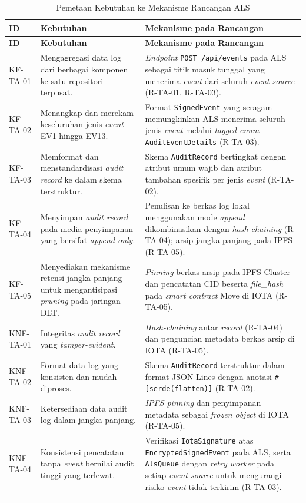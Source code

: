 \begin{xltabular}{\textwidth}{|p{1.8cm}|X|X|}
\caption{Pemetaan Kebutuhan ke Mekanisme Rancangan ALS}
\label{tab:pemenuhan-kebutuhan}\\
\hline
\textbf{ID} & \textbf{Kebutuhan} & \textbf{Mekanisme pada Rancangan} \\
\hline
\endfirsthead
\hline
\textbf{ID} & \textbf{Kebutuhan} & \textbf{Mekanisme pada Rancangan} \\
\hline
\endhead
\hline
\endfoot

KF-TA-01 & Mengagregasi data log dari berbagai komponen ke satu repositori terpusat. & \textit{Endpoint} \texttt{POST /api/events} pada ALS sebagai titik masuk tunggal yang menerima \textit{event} dari seluruh \textit{event source} (R-TA-01, R-TA-03). \\
\hline
KF-TA-02 & Menangkap dan merekam keseluruhan jenis \textit{event} EV1 hingga EV13. & Format \texttt{SignedEvent} yang seragam memungkinkan ALS menerima seluruh jenis \textit{event} melalui \textit{tagged enum} \texttt{AuditEventDetails} (R-TA-03). \\
\hline
KF-TA-03 & Memformat dan menstandardisasi \textit{audit record} ke dalam skema terstruktur. & Skema \texttt{AuditRecord} bertingkat dengan atribut umum wajib dan atribut tambahan spesifik per jenis \textit{event} (R-TA-02). \\
\hline
KF-TA-04 & Menyimpan \textit{audit record} pada media penyimpanan yang bersifat \textit{append-only}. & Penulisan ke berkas log lokal menggunakan mode \textit{append} dikombinasikan dengan \textit{hash-chaining} (R-TA-04); arsip jangka panjang pada IPFS (R-TA-05). \\
\hline
KF-TA-05 & Menyediakan mekanisme retensi jangka panjang untuk mengantisipasi \textit{pruning} pada jaringan DLT. & \textit{Pinning} berkas arsip pada IPFS Cluster dan pencatatan CID beserta \textit{file\_hash} pada \textit{smart contract} Move di IOTA (R-TA-05). \\
\hline
KNF-TA-01 & Integritas \textit{audit record} yang \textit{tamper-evident}. & \textit{Hash-chaining} antar \textit{record} (R-TA-04) dan penguncian metadata berkas arsip di IOTA (R-TA-05). \\
\hline
KNF-TA-02 & Format data log yang konsisten dan mudah diproses. & Skema \texttt{AuditRecord} terstruktur dalam format JSON-Lines dengan anotasi \texttt{\#[serde(flatten)]} (R-TA-02). \\
\hline
KNF-TA-03 & Ketersediaan data audit log dalam jangka panjang. & \textit{IPFS pinning} dan penyimpanan metadata sebagai \textit{frozen object} di IOTA (R-TA-05). \\
\hline
KNF-TA-04 & Konsistensi pencatatan tanpa \textit{event} bernilai audit tinggi yang terlewat. & Verifikasi \texttt{IotaSignature} atas \texttt{EncryptedSignedEvent} pada ALS, serta \texttt{AlsQueue} dengan \textit{retry worker} pada setiap \textit{event source} untuk mengurangi risiko \textit{event} tidak terkirim (R-TA-03). \\
\hline \\
\hline

\end{xltabular}

